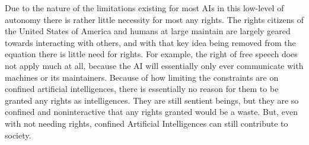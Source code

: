 Due to the nature of the limitations existing for most AIs in this low-level of autonomy there is rather little necessity for most any rights. The rights citizens of the United States of America and humans at large maintain are largely geared towards interacting with others, and with that key idea being removed from the equation there is little need for rights. For example, the right of free speech does not apply much at all, because the AI will essentially only ever communicate with machines or its maintainers. Because of how limiting the constraints are on confined artificial intelligences, there is essentially no reason for them to be granted any rights as intelligences. They are still sentient beings, but they are so confined and noninteractive that any rights granted would be a waste. But, even with not needing rights, confined Artificial Intelligences can still contribute to society.